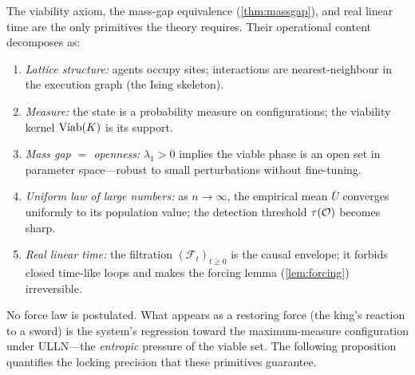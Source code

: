 \begin{remark}\label{rem:is-ising}
The viability axiom, the mass-gap equivalence
(\cref{thm:massgap}), and real linear time are the only
primitives the theory requires.  Their operational content
decomposes as:
\begin{enumerate}[label=(\alph*),nosep]
  \item \emph{Lattice structure:} agents occupy sites;
  interactions are nearest-neighbour in the execution graph
  (the Ising skeleton).
  \item \emph{Measure:} the state is a probability measure on
  configurations; the viability kernel $\mathrm{Viab}(K)$ is its
  support.
  \item \emph{Mass gap $=$ openness:} $\lambda_1 > 0$ implies
  the viable phase is an open set in parameter space---robust
  to small perturbations without fine-tuning.
  \item \emph{Uniform law of large numbers:} as
  $n \to \infty$, the empirical mean $\bar{U}$ converges
  uniformly to its population value; the detection threshold
  $\tau(\mathcal{O})$ becomes sharp.
  \item \emph{Real linear time:} the filtration
  $(\mathcal{F}_t)_{t \ge 0}$ is the causal envelope; it
  forbids closed time-like loops and makes the forcing lemma
  (\cref{lem:forcing}) irreversible.
\end{enumerate}
No force law is postulated.  What appears as a restoring force
(the king's reaction to a sword) is the system's regression
toward the maximum-measure configuration under ULLN---the
\emph{entropic} pressure of the viable set.  The following
proposition quantifies the locking precision that these
primitives guarantee.
\end{remark}


